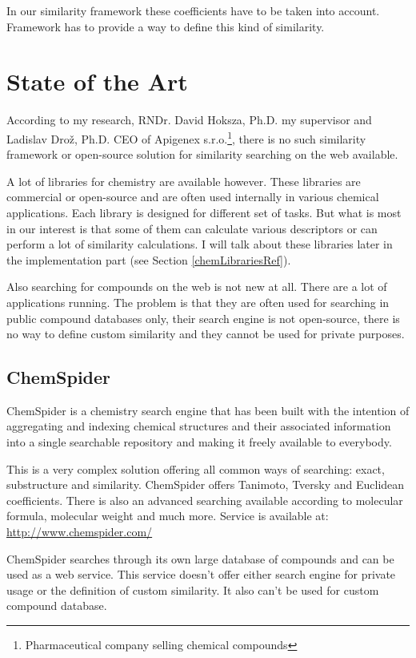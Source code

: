 \documentclass[thesis=M,english]{FITthesis}[2012/10/20]
\begin{document}
In our similarity framework these coefficients have to be taken into account. Framework has to provide a way to define this kind of similarity.


\section{State of the Art}
According to my research, RNDr. David Hoksza, Ph.D. my supervisor and Ladislav Drož, Ph.D. CEO of Apigenex s.r.o.\footnote{ Pharmaceutical company selling chemical compounds}, there is no such similarity framework or open-source solution for similarity searching on the web available.

A lot of libraries for chemistry are available however. These libraries are commercial or open-source and are often used internally in various chemical applications. Each library is designed for different set of tasks. But what is most in our interest is that some of them can calculate various descriptors or can perform a lot of similarity calculations. I will talk about these libraries later in the implementation part (see Section \ref{chemLibrariesRef}).

Also searching for compounds on the web is not new at all. There are a lot of applications running. The problem is that they are often used for searching in public compound databases only, their search engine is not open-source, there is no way to define custom similarity and they cannot be used for private purposes. 

\subsection{ChemSpider}
ChemSpider is a chemistry search engine that has been built with the intention of aggregating and indexing chemical structures and their associated information into a single searchable repository and making it freely available to everybody.\cite{taverna}

This is a very complex solution offering all common ways of searching: exact, substructure and similarity. ChemSpider offers Tanimoto, Tversky and Euclidean coefficients. There is also an advanced searching available according to molecular formula, molecular weight and much more. Service is available at: \url{http://www.chemspider.com/}

ChemSpider searches through its own large database of compounds and can be used as a web service.
This service doesn’t offer either search engine for private usage or the definition of custom similarity.  It also can’t be used for custom compound database.
\end{document}
